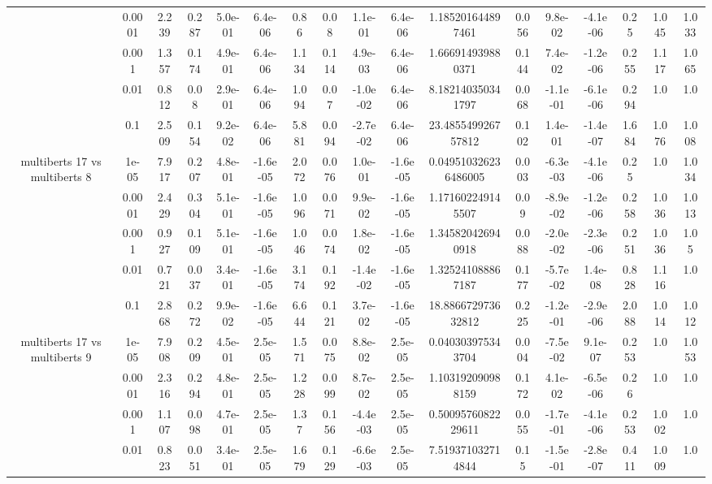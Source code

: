 \begin{tabular}{|c|c|c|c|c|c|c|c|c|c|c|c|c|c|c|c|c|}
 & 0.0001 & 2.239 & 0.287 & 5.0e-01 & 6.4e-06 & 0.86 & 0.08 & 1.1e-01 & 6.4e-06 & 1.185201644897461 & 0.056 & 9.8e-02 & -4.1e-06 & 0.25 & 1.045 & 1.033 \\
 & 0.001 & 1.357 & 0.174 & 4.9e-01 & 6.4e-06 & 1.134 & 0.114 & 4.9e-03 & 6.4e-06 & 1.666914939880371 & 0.144 & 7.4e-02 & -1.2e-06 & 0.255 & 1.117 & 1.065 \\
 & 0.01 & 0.812 & 0.08 & 2.9e-01 & 6.4e-06 & 1.094 & 0.07 & -1.0e-02 & 6.4e-06 & 8.182140350341797 & 0.068 & -1.1e-01 & -6.1e-06 & 0.294 & 1.0 & 1.0 \\
 & 0.1 & 2.509 & 0.154 & 9.2e-02 & 6.4e-06 & 5.881 & 0.094 & -2.7e-02 & 6.4e-06 & 23.485549926757812 & 0.102 & 1.4e-01 & -1.4e-07 & 1.684 & 1.076 & 1.008 \\
\hline
\multirow{5}{*}{multiberts 17 vs multiberts 8} & 1e-05 & 7.917 & 0.207 & 4.8e-01 & -1.6e-05 & 2.072 & 0.076 & 1.0e-01 & -1.6e-05 & 0.049510326236486005 & 0.003 & -6.3e-03 & -4.1e-06 & 0.25 & 1.0 & 1.034 \\
 & 0.0001 & 2.429 & 0.304 & 5.1e-01 & -1.6e-05 & 1.096 & 0.071 & 9.9e-02 & -1.6e-05 & 1.171602249145507 & 0.09 & -8.9e-02 & -1.2e-06 & 0.258 & 1.036 & 1.013 \\
 & 0.001 & 0.927 & 0.109 & 5.1e-01 & -1.6e-05 & 1.046 & 0.074 & 1.8e-02 & -1.6e-05 & 1.345820426940918 & 0.088 & -2.0e-02 & -2.3e-06 & 0.251 & 1.036 & 1.05 \\
 & 0.01 & 0.721 & 0.037 & 3.4e-01 & -1.6e-05 & 3.174 & 0.192 & -1.4e-02 & -1.6e-05 & 1.325241088867187 & 0.177 & -5.7e-02 & 1.4e-08 & 0.828 & 1.116 & 1.0 \\
 & 0.1 & 2.868 & 0.272 & 9.9e-02 & -1.6e-05 & 6.644 & 0.121 & 3.7e-02 & -1.6e-05 & 18.886672973632812 & 0.225 & -1.2e-01 & -2.9e-06 & 2.088 & 1.014 & 1.012 \\
\hline
\multirow{5}{*}{multiberts 17 vs multiberts 9} & 1e-05 & 7.908 & 0.209 & 4.5e-01 & 2.5e-05 & 1.571 & 0.075 & 8.8e-02 & 2.5e-05 & 0.040303975343704 & 0.004 & -7.5e-02 & 9.1e-07 & 0.253 & 1.0 & 1.053 \\
 & 0.0001 & 2.316 & 0.294 & 4.8e-01 & 2.5e-05 & 1.228 & 0.099 & 8.7e-02 & 2.5e-05 & 1.103192090988159 & 0.172 & 4.1e-02 & -6.5e-06 & 0.26 & 1.0 & 1.0 \\
 & 0.001 & 1.107 & 0.098 & 4.7e-01 & 2.5e-05 & 1.37 & 0.156 & -4.4e-03 & 2.5e-05 & 0.5009576082229611 & 0.055 & -1.7e-01 & -4.1e-06 & 0.253 & 1.002 & 1.0 \\
 & 0.01 & 0.823 & 0.051 & 3.4e-01 & 2.5e-05 & 1.679 & 0.129 & -6.6e-03 & 2.5e-05 & 7.519371032714844 & 0.15 & -1.5e-01 & -2.8e-07 & 0.411 & 1.009 & 1.0 \\

\end{tabular}
